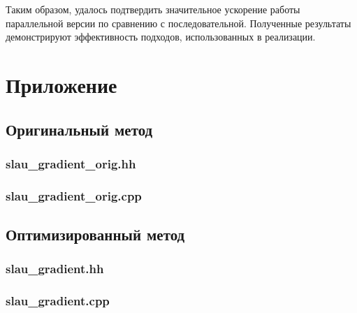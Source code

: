 \documentclass[12pt]{extarticle}
\begin{document}
\begin{spacing}{1.5}
    Таким образом, удалось подтвердить значительное ускорение работы параллельной версии по сравнению с последовательной. Полученные результаты демонстрируют эффективность подходов, использованных в реализации. 

    \newpage
    \section{Приложение}

    \subsection{Оригинальный метод}
    \subsubsection*{slau\_gradient\_orig.hh}
    
    \subsubsection*{slau\_gradient\_orig.cpp}
    
    
    \subsection{Оптимизированный метод}

    \subsubsection*{slau\_gradient.hh}
    
    \subsubsection*{slau\_gradient.cpp}
    


    \end{spacing}
\end{document}
